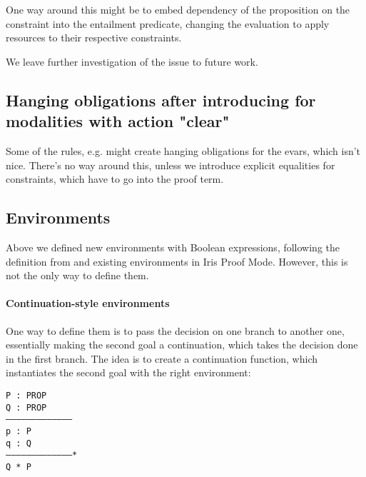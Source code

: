 One way around this might be to embed dependency of the proposition on the constraint into the entailment predicate, changing the evaluation to apply resources to their respective constraints.

We leave further investigation of the issue to future work.


\subsection{Hanging obligations after introducing for modalities with action "clear"}
\label{subsec:hanging-obligations}

Some of the rules, e.g.  might create hanging obligations for the evars, which isn't nice.
There's no way around this, unless we introduce explicit equalities for constraints, which have to go into the proof term.

\subsection{Environments}
\label{subsec:environments}

Above we defined new environments with Boolean expressions, following the definition from \citeauthor{harlandResourceDistributionBooleanConstraints2003} and existing environments in Iris Proof Mode.
However, this is not the only way to define them.

\paragraph{Continuation-style environments}

One way to define them is to pass the decision on one branch to another one, essentially making the second goal a continuation, which takes the decision done in the first branch.
The idea is to create a continuation function, which instantiates the second goal with the right environment:
\begin{minipage}{\linewidth}
\texttt{P : PROP\\
Q : PROP\\
---------------------------------------\\
p : P\\
q : Q\\
---------------------------------------*\\
Q * P
}
\end{minipage}

